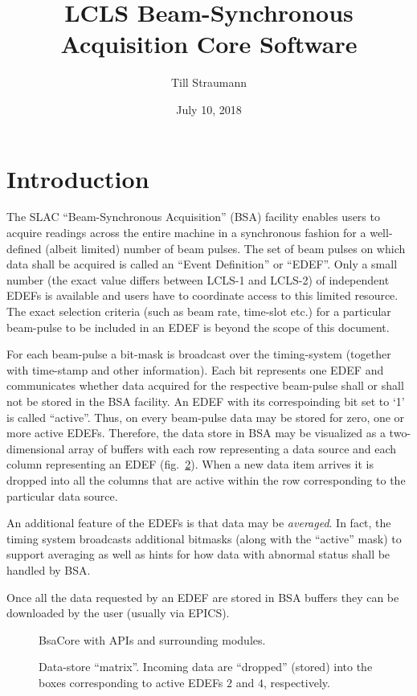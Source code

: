 \documentclass[11pt]{article}
\title{LCLS Beam-Synchronous Acquisition Core Software}
\author{Till Straumann}
\date{July 10, 2018}
\newcommand{\bsac}{BsaCore}
\newcommand{\bsa} {BSA}
\newcommand{\slac}{SLAC}
\newcommand{\EDEF}{EDEF}
\newcounter{figs}
\newcommand{\fig}[3][0]{
\refstepcounter{figs}
\hfill\resizebox{#2}{!}{
        \rotatebox{#1}{\texttt{[image: \#3]}}}\hspace*{\fill}
}
\begin{document}
\maketitle
\section{Introduction}
The \slac{} ``Beam-Synchronous Acquisition'' (\bsa) facility enables users to acquire
readings across the entire machine in a synchronous fashion for a well-defined (albeit
limited) number of beam pulses. The set of beam pulses on which data shall be acquired
is called an ``Event Definition'' or ``{\EDEF}''. Only a small number (the exact value differs
between LCLS-1 and LCLS-2) of independent \EDEF{}s is available and users have to
coordinate access to this limited resource. The exact selection criteria (such as
beam rate, time-slot etc.) for a particular beam-pulse to be included in an \EDEF{} is beyond
the scope of this document.

For each beam-pulse a bit-mask is broadcast over the timing-system (together with time-stamp
and other information). Each bit represents one \EDEF{} and communicates whether data acquired
for the respective beam-pulse shall or shall not be stored in the \bsa{} facility. An \EDEF{}
with its correspoinding bit set to `1' is called ``active''. Thus,
on every beam-pulse data may be stored for zero, one or more active \EDEF{}s. Therefore, the data
store in \bsa{} may be visualized as a two-dimensional array of buffers with each row
representing a data source and each column representing an \EDEF{} (fig.~\ref{fig:edefmat}). When a new data item
arrives it is dropped into all the columns that are active within the row corresponding
to the particular data source.

An additional feature of the \EDEF{}s is that data may be {\em averaged}. In fact, the
timing system broadcasts additional bitmasks (along with the ``active'' mask) to support
averaging as well as hints for how data with abnormal status shall be handled by \bsa.

Once all the data requested by an \EDEF{} are stored in \bsa{} buffers they can be downloaded
by the user (usually via EPICS).

\begin{figure}
\fig{0.5\textwidth}{fig_blkdiag.eps}
\label{fig:bdiag}
\caption{\bsac{} with APIs and surrounding modules.}
\end{figure}

\begin{figure}
\fig{0.5\textwidth}{fig_edefmat.eps}
\label{fig:edefmat}
\caption{Data-store ``matrix''. Incoming data are ``dropped'' (stored) into the boxes corresponding to active EDEFs $2$ and $4$, respectively.}
\end{figure}
\end{document}
